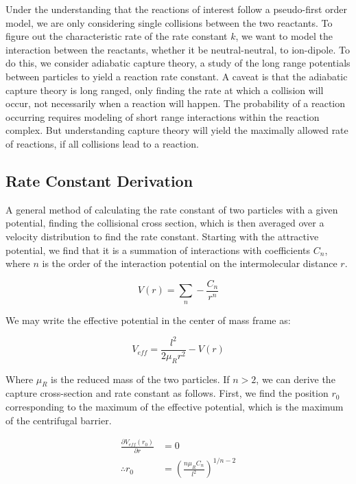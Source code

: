 Under the understanding that the reactions of interest follow a pseudo-first order model, we are only considering single collisions between the two reactants. To figure out the characteristic rate of the rate constant $k$, we want to model the interaction between the reactants, whether it be neutral-neutral, to ion-dipole. To do this, we consider adiabatic capture theory, a study of the long range potentials between particles to yield a reaction rate constant. A caveat is that the adiabatic capture theory is long ranged, only finding the rate at which a collision will occur, not necessarily when a reaction will happen. The probability of a reaction occurring requires modeling of short range interactions within the reaction complex. But understanding capture theory will yield the maximally allowed rate of reactions, if all collisions lead to a reaction.

\subsection{Rate Constant Derivation} \label{sec: ACT}
A general method of calculating the rate constant of two particles with a given potential, finding the collisional cross section, which is then averaged over a velocity distribution to find the rate constant.\cite{Zhang2017} Starting with the attractive potential, we find that it is a summation of interactions with coefficients $C_n$, where $n$ is the order of the interaction potential on the intermolecular distance $r$.

\begin{equation}
    V(r) = \sum_n -\frac{C_n}{r^n}
\end{equation}

We may write the effective potential in the center of mass frame as:

\begin{equation}
    V_{eff} = \frac{l^2}{2 \mu_R r^2} -V(r)\label{eq: veff}
\end{equation}

Where $\mu_R$ is the reduced mass of the two particles. If $n > 2$, we can derive the capture cross-section and rate constant as follows. First, we find the position $r_0$ corresponding to the maximum of the effective potential, which is the maximum of the centrifugal barrier.

\begin{align*}
    \frac{\partial V_{eff}(r_0)}{\partial r} & = 0 \\
    \therefore r_0 & = \left(\frac{n \mu_R C_n}{l^2}\right)^{1/n-2}
\end{align*}

